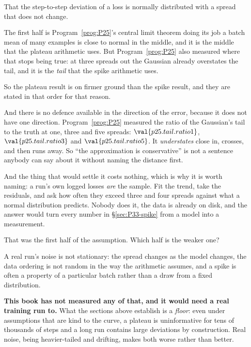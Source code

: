 \begin{fr}
\begin{ansblock}
That the step-to-step deviation of a loss is normally distributed with a
spread that does not change.
\end{ansblock}

The first half is Program~\ref{prog:P25}'s central limit theorem doing its
job \dash{} a batch mean of many examples is close to normal in the middle,
and it is the middle that the plateau arithmetic uses. But
Program~\ref{prog:P25} also measured where that stops being true: at three
spreads out the Gaussian already overstates the tail, and it is the
\emph{tail} that the spike arithmetic uses.

So the plateau result is on firmer ground than the spike result, and they are
stated in that order for that reason.

And there is no defence available in the direction of the error, because it
does not have one direction. Program~\ref{prog:P25} measured the ratio of the
Gaussian's tail to the truth at one, three and five spreads:
$\val{p25.tail.ratio1}$, $\val{p25.tail.ratio3}$ and
$\val{p25.tail.ratio5}$. It \emph{understates} close in, crosses, and then
runs away. So \enquote{the approximation is conservative} is not a sentence
anybody can say about it without naming the distance first.

And the thing that would settle it costs nothing, which is why it is worth
naming: a run's own logged losses \emph{are} the sample. Fit the trend, take
the residuals, and ask how often they exceed three and four spreads against
what a normal distribution predicts. Nobody does it, the data is already on
disk, and the answer would turn every number in \S\ref{sec:P33-spike} from a
model into a measurement.

That was the first half of the assumption. Which half is the weaker one?
\dotline
\nextframe
\end{fr}

\begin{fr}
A real run's noise is not stationary: the
spread changes as the model changes, the data ordering is not random in the
way the arithmetic assumes, and a spike is often a property of a particular
batch rather than a draw from a fixed distribution.

\begin{warning}
\textbf{This book has not measured any of that, and it would need a real
training run to.} What the sections above establish is a \emph{floor}: even
under assumptions that are kind to the curve, a plateau is uninformative for
tens of thousands of steps and a long run contains large deviations by
construction. Real noise, being heavier-tailed and drifting, makes both
worse rather than better.
\end{warning}
\end{fr}

